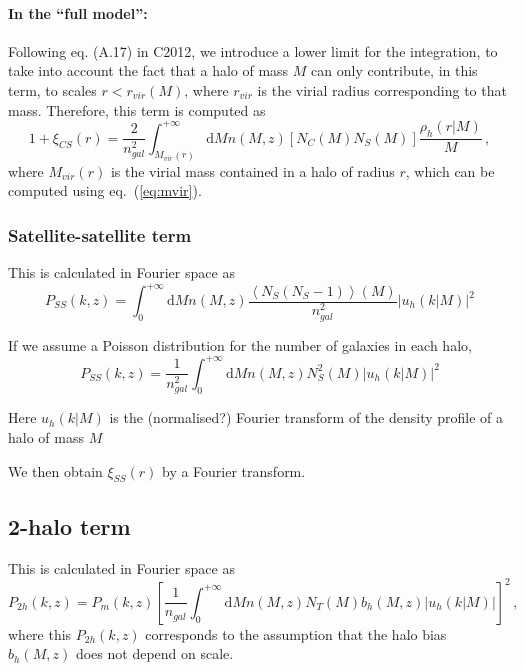 \documentclass[10pt,a4paper]{article}
\begin{document}
\paragraph{In the ``full model'':}

Following eq. (A.17) in C2012, we introduce a lower limit for the integration, to take into account the fact that a halo of mass $M$ can only contribute, in this term, to scales $r < r_{vir}(M)$, where $r_{vir}$ is the virial radius corresponding to that mass.
Therefore, this term is computed as
\begin{equation}
1 + \xi_{CS}(r) = \frac{2}{n_{gal}^2} \int_{M_{vir}(r)}^{+\infty} \mathrm{d}M n(M,z) \left[N_C(M) N_S(M)\right] \frac{\rho_h(r|M)}{M} \, ,
\end{equation}
where $M_{vir}(r)$ is the virial mass contained in a halo of radius $r$, which can be computed using eq.~(\ref{eq:mvir}).






\subsubsection{Satellite-satellite term}

This is calculated in Fourier space as
\begin{equation}
P_{SS}(k,z) = \int_0^{+\infty} \mathrm{d}M n(M,z) \frac{\left\langle N_S (N_S - 1) \right\rangle(M)}{n_{gal}^2} \left| u_h(k|M)\right|^2
\end{equation}

If we assume a Poisson distribution for the number of galaxies in each halo,
\begin{equation}
P_{SS}(k,z) = \frac{1}{n_{gal}^2}\int_0^{+\infty} \mathrm{d}M n(M,z) N_S^2(M) \left| u_h(k|M)\right|^2
\end{equation}

Here $u_h(k|M)$ is the (normalised?) Fourier transform of the density profile of a halo of mass $M$

We then obtain $\xi_{SS}(r)$ by a Fourier transform.

\subsection{2-halo term}

This is calculated in Fourier space as
\begin{equation}
\label{eq:P2h}
P_{2h}(k,z) = P_m(k,z)\left[ \frac{1}{n_{gal}} \int_0^{+\infty} \mathrm{d}M n(M,z) N_T(M) b_h(M,z) \left| u_h(k|M)\right| \right]^2 \, ,
\end{equation}
where this $P_{2h}(k,z)$ corresponds to the assumption that the halo bias $b_h(M,z)$ does not depend on scale.
\end{document}
